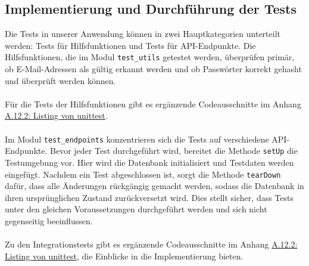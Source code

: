 \documentclass[a4paper,12pt]{article}
\begin{document}
\subsection{Implementierung und Durchführung der Tests}
Die Tests in unserer Anwendung können in zwei Hauptkategorien unterteilt werden: Tests für Hilfsfunktionen und Tests für API-Endpunkte. Die Hilfsfunktionen, die im Modul \texttt{test\_utils} getestet werden, überprüfen primär, ob E-Mail-Adressen als gültig erkannt werden und ob Passwörter korrekt gehasht und überprüft werden können.\\
\\
Für die Tests der Hilfsfunktionen gibt es ergänzende Codeausschnitte im Anhang \hyperref[lst:utilstest]{A.12.2: Listing von unittest}.\\
\\
Im Modul \texttt{test\_endpoints} konzentrieren sich die Tests auf verschiedene API-Endpunkte. Bevor jeder Test durchgeführt wird, bereitet die Methode \texttt{setUp} die Testumgebung vor. Hier wird die Datenbank initialisiert und Testdaten werden eingefügt. Nachdem ein Test abgeschlossen ist, sorgt die Methode \texttt{tearDown} dafür, dass alle Änderungen rückgängig gemacht werden, sodass die Datenbank in ihren ursprünglichen Zustand zurückversetzt wird. Dies stellt sicher, dass Tests unter den gleichen Voraussetzungen durchgeführt werden und sich nicht gegenseitig beeinflussen.\\
\\
Zu den Integrationstests gibt es ergänzende Codeausschnitte im Anhang \hyperref[lst:integrationtest]{A.12.2: Listing von unittest}, die Einblicke in die Implementierung bieten.
\end{document}
